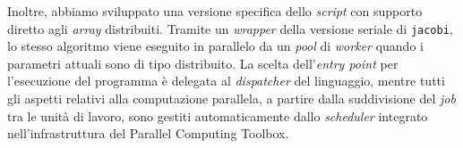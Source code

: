 Inoltre, abbiamo sviluppato una versione specifica dello \textit{script} con supporto diretto agli \textit{array} distribuiti.\newline
Tramite un \textit{wrapper} della versione seriale di \lstinline{jacobi}, lo stesso algoritmo viene eseguito in parallelo da un \textit{pool} di \textit{worker}
quando i parametri attuali sono di tipo distribuito.\newline
La scelta dell'\textit{entry point} per l'esecuzione del programma \`e delegata al \textit{dispatcher} del linguaggio,
mentre tutti gli aspetti relativi alla computazione parallela, a partire dalla suddivisione del \textit{job} tra le unit\`a di lavoro, sono
gestiti automaticamente dallo \textit{scheduler} integrato nell'infrastruttura del Parallel Computing Toolbox.